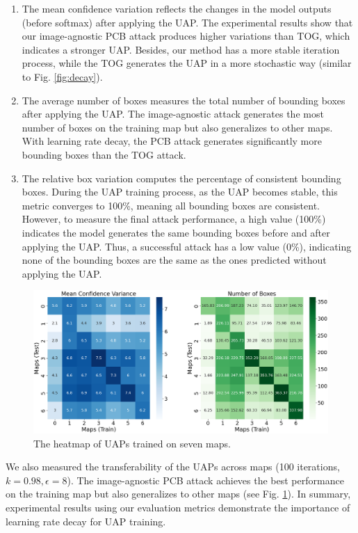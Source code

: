\begin{enumerate}
    \item The mean confidence variation reflects the changes in the model outputs (before softmax) after applying the UAP. The experimental results show that our image-agnostic PCB attack produces higher variations than TOG, which indicates a stronger UAP. Besides, our method has a more stable iteration process, while the TOG generates the UAP in a more stochastic way (similar to Fig. \ref{fig:decay}).
    \item The average number of boxes measures the total number of bounding boxes after applying the UAP. The image-agnostic attack generates the most number of boxes on the training map but also generalizes to other maps. With learning rate decay, the PCB attack generates significantly more bounding boxes than the TOG attack.
    \item The relative box variation computes the percentage of consistent bounding boxes. During the UAP training process, as the UAP becomes stable, this metric converges to 100\%, meaning all bounding boxes are consistent. However, to measure the final attack performance, a high value (100\%) indicates the model generates the same bounding boxes before and after applying the UAP. Thus, a successful attack has a low value (0\%), indicating none of the bounding boxes are the same as the ones predicted without applying the UAP.
\end{enumerate}



\begin{figure}[tbhp]
    \centering
    \includegraphics[width=\linewidth]{figures/chapter_detection/hardware/cor.png}
  \caption{The heatmap of UAPs trained on seven maps.}
  \label{fig:cor}
\end{figure}



We also measured the transferability of the UAPs across maps (100 iterations, $k=0.98, \epsilon=8$). The image-agnostic PCB attack achieves the best performance on the training map but also generalizes to other maps (see Fig. \ref{fig:cor}). In summary, experimental results using our evaluation metrics demonstrate the importance of learning rate decay for UAP training.

